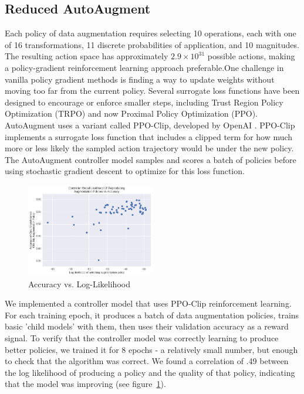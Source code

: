 \documentclass[10pt,twocolumn,letterpaper]{article}
\begin{document}
	\subsection{Reduced AutoAugment}
		Each policy of data augmentation requires selecting 10 operations, each with one of 16 transformations, 11 discrete probabilities of application, and 10 magnitudes.  The resulting action space has approximately $2.9 \times 10^{31}$ possible actions, making a policy-gradient reinforcement learning approach preferable.One challenge in vanilla policy gradient methods is finding a way to update weights without moving too far from the current policy. Several surrogate loss functions have been designed to encourage or enforce smaller steps, including Trust Region Policy Optimization (TRPO) and now Proximal Policy Optimization (PPO). AutoAugment uses a variant called PPO-Clip, developed by OpenAI \cite{Schulman2017}. PPO-Clip implements a surrogate loss function that includes a clipped term for how much more or less likely the sampled action trajectory would be under the new policy. The AutoAugment controller model samples and scores a batch of policies before using stochastic gradient descent to optimize for this loss function.
		
		\begin{figure}[h]		
			\begin{center}
		   		\includegraphics[width=0.5\textwidth]{ReducedAutoAugment.png}
			\end{center}
		   	\caption{Accuracy vs. Log-Likelihood}
		   	\label{fig:RAA}
		\end{figure}
		
		We implemented a controller model that uses PPO-Clip reinforcement learning. For each training epoch, it produces a batch of data augmentation policies, trains basic 'child models' with them, then uses their validation accuracy as a reward signal. To verify that the controller model was correctly learning to produce better policies, we trained it for 8 epochs - a relatively small number, but enough to check that the algorithm was correct. We found a correlation of .49 between the log likelihood of producing a policy and the quality of that policy, indicating that the model was improving (see figure~\ref{fig:RAA}).
		
\end{document}
